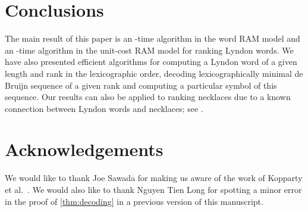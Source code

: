 \documentclass{article}
\theoremstyle{definition}
\theoremstyle{remark}
\begin{document}
\section{Conclusions}\label{sec:concl}

The main result of this paper is an -time algorithm in the word RAM model
and an -time algorithm in the unit-cost RAM model for ranking Lyndon words.
We have also presented efficient algorithms for computing a Lyndon word of a given length and rank
in the lexicographic order, decoding lexicographically minimal de Bruijn sequence
of a given rank and computing a particular symbol of this sequence.
Our results can also be applied to ranking necklaces due to a known connection
between Lyndon words and necklaces; see \cite{DBLP:conf/icalp/KoppartyKS14}.




\section{Acknowledgements}

We would like to thank Joe Sawada for making us aware of the work of Kopparty et al.\ \cite{DBLP:conf/icalp/KoppartyKS14}.
We would also like to thank Nguyen Tien Long for spotting a minor error in the proof of \cref{thm:decoding} in a previous version of this manuscript.






\end{document}

